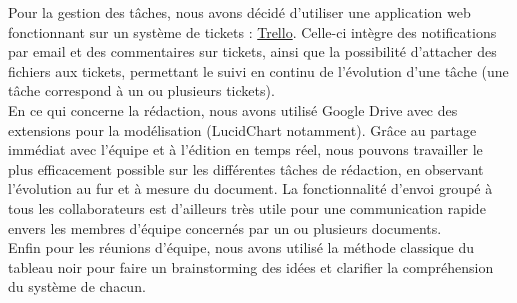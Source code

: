 Pour la gestion des tâches, nous avons décidé d'utiliser une application web
fonctionnant sur un système de tickets : \href{https://trello.com}{Trello}. Celle-ci
intègre des notifications par email et des commentaires sur tickets, ainsi que
la possibilité d'attacher des fichiers aux tickets, permettant le suivi en
continu de l'évolution d'une tâche (une tâche correspond à un ou plusieurs
tickets). \\

En ce qui concerne la rédaction, nous avons utilisé Google Drive avec des
extensions pour la modélisation (LucidChart notamment). Grâce au partage
immédiat avec l'équipe et à l'édition en temps réel, nous pouvons travailler le
plus efficacement possible sur les différentes tâches de rédaction, en
observant l'évolution au fur et à mesure du document. La fonctionnalité d'envoi
groupé à tous les collaborateurs est d'ailleurs très utile pour une
communication rapide envers les membres d'équipe concernés par un ou plusieurs
documents. \\

Enfin pour les réunions d'équipe, nous avons utilisé la méthode classique du
tableau noir pour faire un brainstorming des idées et clarifier la
compréhension du système de chacun.


